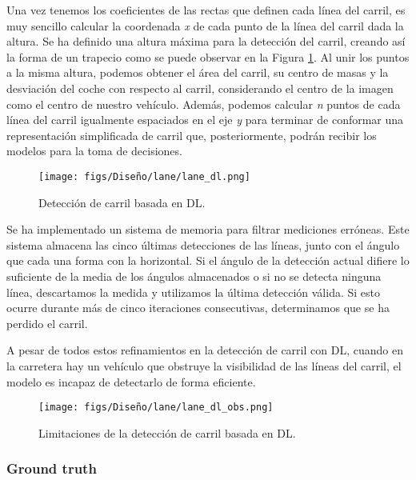 Una vez tenemos los coeficientes de las rectas que definen cada línea del carril, es muy sencillo calcular la coordenada \textit{x} de cada punto de la línea del carril dada la altura. Se ha definido una altura máxima para la detección del carril, creando así la forma de un trapecio como se puede observar en la Figura \ref{fig:dl_final_carril}. Al unir los puntos a la misma altura, podemos obtener el área del carril, su centro de masas y la desviación del coche con respecto al carril, considerando el centro de la imagen como el centro de nuestro vehículo. Además, podemos calcular \textit{n} puntos de cada línea del carril igualmente espaciados en el eje \textit{y} para terminar de conformar una representación simplificada de carril que, posteriormente, podrán recibir los modelos para la toma de decisiones.

\begin{figure}[ht]
\centering
\texttt{[image: figs/Diseño/lane/lane\_dl.png]}
\caption{Detección de carril basada en \ac{DL}.}
\label{fig:dl_final_carril}
\end{figure}

Se ha implementado un sistema de memoria para filtrar mediciones erróneas. Este sistema almacena las cinco últimas detecciones de las líneas, junto con el ángulo que cada una forma con la horizontal. Si el ángulo de la detección actual difiere lo suficiente de la media de los ángulos almacenados o si no se detecta ninguna línea, descartamos la medida y utilizamos la última detección válida. Si esto ocurre durante más de cinco iteraciones consecutivas, determinamos que se ha perdido el carril.

A pesar de todos estos refinamientos en la detección de carril con \ac{DL}, cuando en la carretera hay un vehículo que obstruye la visibilidad de las líneas del carril, el modelo es incapaz de detectarlo de forma eficiente.

\begin{figure}[ht]
\centering
\texttt{[image: figs/Diseño/lane/lane\_dl\_obs.png]}
\caption{Limitaciones de la detección de carril basada en \ac{DL}.}
\label{fig:dl_final_carril_obs}
\end{figure}

\subsubsection{Ground truth}

